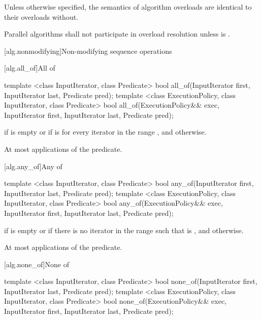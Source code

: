 \pnum
Unless otherwise specified, the semantics of  algorithm
overloads are identical to their overloads without.

\pnum
Parallel algorithms shall not participate in overload resolution unless
 is .

[alg.nonmodifying]{Non-modifying sequence operations}

[alg.all_of]{All of}

%
\begin{itemdecl}
template <class InputIterator, class Predicate>
  bool all_of(InputIterator first, InputIterator last, Predicate pred);
template <class ExecutionPolicy, class InputIterator, class Predicate>
  bool all_of(ExecutionPolicy&& exec, InputIterator first, InputIterator last,
              Predicate pred);
\end{itemdecl}

\begin{itemdescr}
\pnum
\returns {} if
 is empty or if
 is  for every iterator  in the range , and  otherwise.

\pnum
\complexity At most  applications of the predicate.
\end{itemdescr}

[alg.any_of]{Any of}

%
\begin{itemdecl}
template <class InputIterator, class Predicate>
  bool any_of(InputIterator first, InputIterator last, Predicate pred);
template <class ExecutionPolicy, class InputIterator, class Predicate>
  bool any_of(ExecutionPolicy&& exec, InputIterator first, InputIterator last,
              Predicate pred);
\end{itemdecl}

\begin{itemdescr}
\pnum
\returns {} if  is empty or
if there is no iterator  in the range
 such that  is , and  otherwise.

\pnum
\complexity At most  applications of the predicate.
\end{itemdescr}

[alg.none_of]{None of}

%
\begin{itemdecl}
template <class InputIterator, class Predicate>
  bool none_of(InputIterator first, InputIterator last, Predicate pred);
template <class ExecutionPolicy, class InputIterator, class Predicate>
  bool none_of(ExecutionPolicy&& exec, InputIterator first, InputIterator last,
               Predicate pred);
\end{itemdecl}

